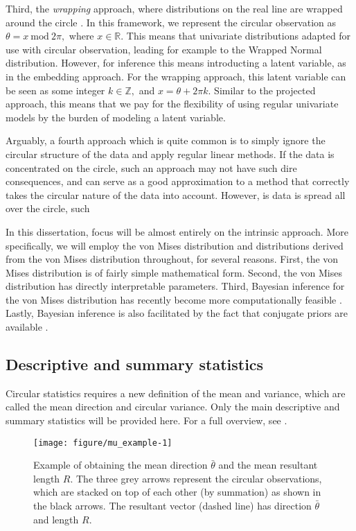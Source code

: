 \documentclass[12pt, a4paper]{book}\usepackage[]{graphicx}\usepackage[]{color}
\newenvironment{knitrout}{}{} %
\begin{document}
Third, the \textit{wrapping} approach, where distributions on the real line are wrapped around the circle \cite{ferrari2009wrapping}. In this framework,  we represent the circular observation as $\theta = x ~\text{mod} ~ 2\pi,$ where \(x \in \mathbb{R}\). This means that univariate distributions adapted for use with circular observation, leading for example to the Wrapped Normal distribution. However, for inference this means introducting a latent variable, as in the embedding approach. For the wrapping approach, this latent variable can be seen as some integer $k \in \mathbb{Z},$ and $x = \theta + 2\pi k.$ Similar to the projected approach, this means that we pay for the flexibility of using regular univariate models by the burden of modeling a latent variable.

Arguably, a fourth approach which is quite common is to simply ignore the circular structure of the data and apply regular linear methods. If the data is concentrated on the circle, such an approach may not have such dire consequences, and can serve as a good approximation to a method that correctly takes the circular nature of the data into account. However, is data is spread all over the circle, such

In this dissertation, focus will be almost entirely on the intrinsic approach. More specifically, we will employ the von Mises distribution and distributions derived from the von Mises distribution throughout, for several reasons. First, the von Mises distribution is of fairly simple mathematical form. Second, the von Mises distribution has directly interpretable parameters. Third, Bayesian inference for the von Mises distribution has recently become more computationally feasible \citep{forbes2015fast}. Lastly, Bayesian inference is also facilitated by the fact that conjugate priors are available \citep{mardia1976bayesian}.


\subsection{Descriptive and summary statistics}


Circular statistics requires a new definition of the mean and variance, which are called the mean direction and circular variance. Only the main descriptive and summary statistics will be provided here. For a full overview, see  \citet{mardia2009directional}.

\begin{figure}
\centering
\begin{knitrout}
\color{fgcolor}
\texttt{[image: figure/mu\_example-1]} 

\end{knitrout}
\caption{Example of obtaining the mean direction $\bar{\theta}$ and the mean resultant length $R$. The three grey arrows represent the circular observations, which are stacked on top of each other (by summation) as shown in the black arrows. The resultant vector (dashed line) has direction $\bar{\theta}$ and length $R$.}\label{exampleRMu}
\end{figure}
\end{document}
